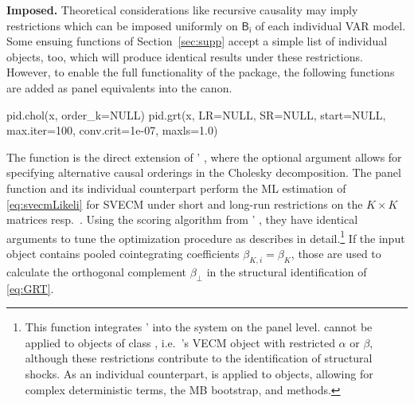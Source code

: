 \textbf{Imposed.} Theoretical considerations like recursive causality may imply restrictions which can be imposed uniformly on $ \mathsf{{B}_i} $ of each individual VAR model. Some ensuing functions of Section~\ref{sec:supp} accept a simple list of individual  objects, too, which will produce identical results under these restrictions. However, to enable the full functionality of the  package, the following functions are added as panel equivalents into the  canon. 
\begin{CodeChunk}
\begin{CodeInput}
pid.chol(x, order_k=NULL)
pid.grt(x, LR=NULL, SR=NULL, start=NULL, max.iter=100, conv.crit=1e-07, maxls=1.0)
\end{CodeInput}
\end{CodeChunk}
The function  is the direct extension of ' , where the optional argument  allows for specifying alternative causal orderings in the Cholesky decomposition. The panel function  and its individual counterpart perform the ML estimation of \eqref{eq:svecmLikeli} for SVECM under short and long-run restrictions on the $ K \times K $ matrices  resp.~. Using the scoring algorithm from ' , they have identical arguments to tune the optimization procedure as \citet[Sec.~3.2]{Pfaff2008a} describes in detail.\footnote{This function integrates '  into the  system on the panel level.  cannot be applied to objects of class , i.e.~'s VECM object with restricted $ \alpha $ or $ \beta $, although these restrictions contribute to the identification of structural shocks. As an individual counterpart,  is applied to  objects, allowing for complex deterministic terms, the MB bootstrap, and  methods.} If the input object  contains pooled cointegrating coefficients $ \beta_{K,i} = \beta_K $, those are used to calculate the orthogonal complement $ \beta_{\perp} $ in the structural identification of \eqref{eq:GRT}.



